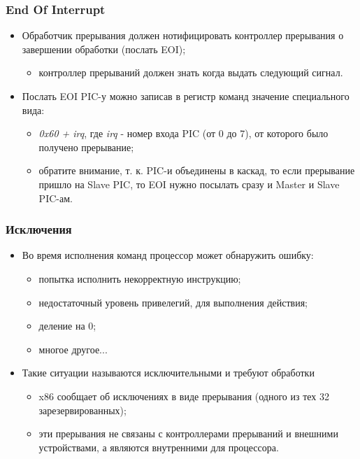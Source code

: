 \begin{frame}
\frametitle{End Of Interrupt}
\begin{itemize}
  \item Обработчик прерывания должен нотифицировать контроллер прерывания о
  завершении обработки (послать EOI);
  \begin{itemize}
    \item контроллер прерываний должен знать когда выдать следующий сигнал.
  \end{itemize}
  \item Послать EOI PIC-у можно записав в регистр команд значение специального
  вида:
  \begin{itemize}
    \item \emph{0x60 + irq}, где \emph{irq} - номер входа PIC (от 0 до 7), от
    которого было получено прерывание;
    \item обратите внимание, т. к. PIC-и объединены в каскад, то если прерывание
    пришло на Slave PIC, то EOI нужно посылать сразу и Master и Slave PIC-ам.
  \end{itemize}
\end{itemize}
\end{frame}

\begin{frame}
\frametitle{Исключения}
\begin{itemize}
  \item Во время исполнения команд процессор может обнаружить ошибку:
  \begin{itemize}
    \item попытка исполнить некорректную инструкцию;
    \item недостаточный уровень привелегий, для выполнения действия;
    \item деление на 0;
    \item многое другое...
  \end{itemize}
  \item Такие ситуации называются исключительными и требуют обработки
  \begin{itemize}
    \item x86 сообщает об исключениях в виде прерывания (одного из тех 32
    зарезервированных);
    \item эти прерывания не связаны с контроллерами прерываний и внешними
    устройствами, а являются внутренними для процессора.
  \end{itemize}
\end{itemize}
\end{frame}

